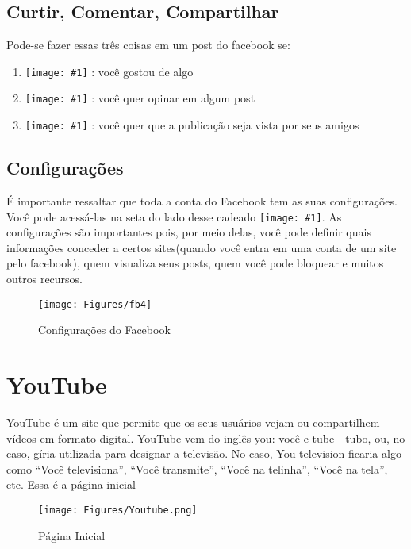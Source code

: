 \documentclass[hidelinks,12pt]{article}
\newcommand{\icon}[1]{\texttt{[image: \#1]}}
\begin{document}
	\subsection{Curtir, Comentar, Compartilhar}

		Pode-se fazer essas três coisas em um post do facebook se:

	\begin{enumerate}
		\item  \icon{Figures/curtir} : você gostou de algo
		\item  \icon{Figures/comentar} : você quer opinar em algum post
		\item  \icon{Figures/compartilhar} : você quer que a publicação seja vista por seus amigos
	\end{enumerate}

	\subsection{Configurações}

	É importante ressaltar que toda a conta do Facebook tem as suas configurações. Você pode acessá-las na seta do lado desse cadeado \icon{Figures/fb5}.
	As configurações são importantes pois, por meio delas,  você pode definir quais informações conceder a certos sites(quando você entra em uma conta de um site pelo facebook), quem visualiza seus posts, quem você pode bloquear e muitos outros recursos.

	\begin{figure}[!h]
		\centering
		\texttt{[image: Figures/fb4]}
		\label{fig:config}
		\caption{Configurações do Facebook}
	\end{figure}
	
	\newpage
	
	\section{YouTube}
	YouTube é um site que permite que os seus usuários vejam ou compartilhem vídeos em formato digital. YouTube vem do inglês you: você e tube - tubo, ou, no caso, gíria utilizada para designar a televisão. No caso, You television ficaria algo como ``Você televisiona'', ``Você transmite'', ``Você na telinha'', ``Você na tela'', etc. Essa é a página inicial
	
	\begin{figure}[!h]
		\centering
		\texttt{[image: Figures/Youtube.png]}
		\label{fig:config}
		\caption{Página Inicial}
	\end{figure}
	
\end{document}

